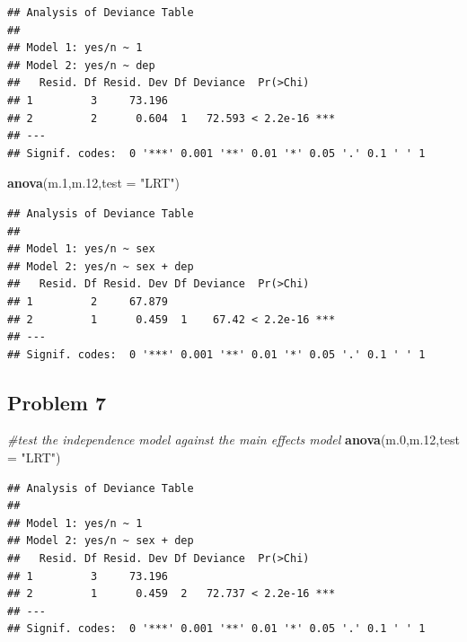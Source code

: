 \documentclass[
  11pt,
]{article}
\newenvironment{Shaded}{\begin{snugshade}}{\end{snugshade}}
\newcommand{\AttributeTok}[1]{\textcolor[rgb]{0.13,0.29,0.53}{#1}}
\newcommand{\CommentTok}[1]{\textcolor[rgb]{0.56,0.35,0.01}{\textit{#1}}}
\newcommand{\FloatTok}[1]{\textcolor[rgb]{0.00,0.00,0.81}{#1}}
\newcommand{\FunctionTok}[1]{\textcolor[rgb]{0.13,0.29,0.53}{\textbf{#1}}}
\newcommand{\NormalTok}[1]{#1}
\newcommand{\StringTok}[1]{\textcolor[rgb]{0.31,0.60,0.02}{#1}}
\begin{document}
\begin{verbatim}
## Analysis of Deviance Table
## 
## Model 1: yes/n ~ 1
## Model 2: yes/n ~ dep
##   Resid. Df Resid. Dev Df Deviance  Pr(>Chi)    
## 1         3     73.196                          
## 2         2      0.604  1   72.593 < 2.2e-16 ***
## ---
## Signif. codes:  0 '***' 0.001 '**' 0.01 '*' 0.05 '.' 0.1 ' ' 1
\end{verbatim}

\begin{Shaded}
\begin{Highlighting}[]
\FunctionTok{anova}\NormalTok{(m}\FloatTok{.1}\NormalTok{,m}\FloatTok{.12}\NormalTok{,}\AttributeTok{test =} \StringTok{"LRT"}\NormalTok{)}
\end{Highlighting}
\end{Shaded}

\begin{verbatim}
## Analysis of Deviance Table
## 
## Model 1: yes/n ~ sex
## Model 2: yes/n ~ sex + dep
##   Resid. Df Resid. Dev Df Deviance  Pr(>Chi)    
## 1         2     67.879                          
## 2         1      0.459  1    67.42 < 2.2e-16 ***
## ---
## Signif. codes:  0 '***' 0.001 '**' 0.01 '*' 0.05 '.' 0.1 ' ' 1
\end{verbatim}

\hypertarget{problem-7}{%
\subsection{Problem 7}\label{problem-7}}


\begin{Shaded}
\begin{Highlighting}[]
\CommentTok{\#test the independence model against the main effects model}
\FunctionTok{anova}\NormalTok{(m}\FloatTok{.0}\NormalTok{,m}\FloatTok{.12}\NormalTok{,}\AttributeTok{test =} \StringTok{"LRT"}\NormalTok{)}
\end{Highlighting}
\end{Shaded}

\begin{verbatim}
## Analysis of Deviance Table
## 
## Model 1: yes/n ~ 1
## Model 2: yes/n ~ sex + dep
##   Resid. Df Resid. Dev Df Deviance  Pr(>Chi)    
## 1         3     73.196                          
## 2         1      0.459  2   72.737 < 2.2e-16 ***
## ---
## Signif. codes:  0 '***' 0.001 '**' 0.01 '*' 0.05 '.' 0.1 ' ' 1
\end{verbatim}
\end{document}
